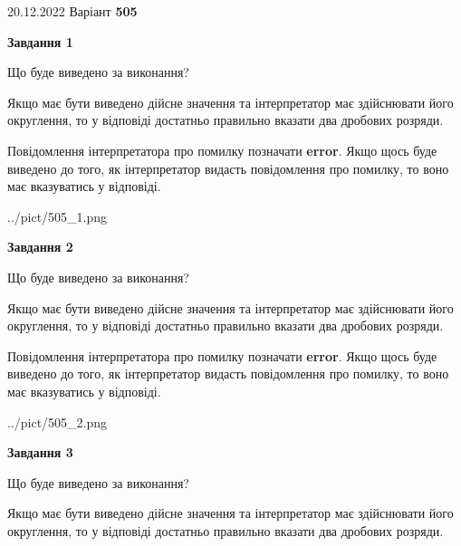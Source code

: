 \documentclass[12pt, ukrainian]{article}
\begin{document}
{20.12.2022 Варіант \No \textbf { 505 }\par}
{
\begin {Large}

{\begin {center}\textbf{Завдання 1}\end {center}}\par
Що буде виведено за виконання? \par

Якщо має бути виведено дійсне значення та інтерпретатор має здійснювати його округлення, 
то у відповіді достатньо правильно вказати два дробових розряди.

Повідомлення інтерпретатора про помилку позначати \textbf{error}.
Якщо щось буде виведено до того, як інтерпретатор видасть повідомлення про помилку, 
то воно має вказуватись у відповіді. \par

\begin{center}
	{../pict/505_1.png}
\end{center}
\newpage

{\begin {center}\textbf{Завдання 2}\end {center}}\par
Що буде виведено за виконання? \par

Якщо має бути виведено дійсне значення та інтерпретатор має здійснювати його округлення, 
то у відповіді достатньо правильно вказати два дробових розряди.

Повідомлення інтерпретатора про помилку позначати \textbf{error}.
Якщо щось буде виведено до того, як інтерпретатор видасть повідомлення про помилку, 
то воно має вказуватись у відповіді. \par

\begin{center}
	{../pict/505_2.png}
\end{center}
\newpage

{\begin {center}\textbf{Завдання 3}\end {center}}\par
Що буде виведено за виконання? \par

Якщо має бути виведено дійсне значення та інтерпретатор має здійснювати його округлення, 
то у відповіді достатньо правильно вказати два дробових розряди.


\end{Large}}
\end{document}
